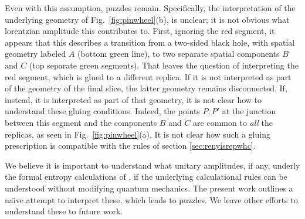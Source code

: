 \documentclass[12pt]{article}
\numberwithin{equation}{section}
\begin{document}
Even with this assumption, puzzles remain. Specifically, 
the interpretation of the underlying geometry of Fig.~\ref{fig:pinwheel}(b), is unclear;  it is not obvious what lorentzian amplitude this contributes to.  First, ignoring the red segment, it appears that this describes a transition from a two-sided black hole, with spatial geometry labeled $A$ (bottom green line), to two separate spatial components $B$ and $C$ (top separate green segments). That leaves the question of interpreting the red segment, which is glued to a different replica.  If it is not interpreted as part of the geometry of the final slice, the latter geometry remains disconnected.  If, instead, it is interpreted as part of that geometry, it is not clear how to understand these gluing conditions.  Indeed, the points $P, P'$ at the junction between this segment and the components $B$ and $C$ are common to {\it all} the replicas, as seen in Fig.~\ref{fig:pinwheel}(a).  It is
 not clear how such a gluing prescription is compatible with the rules of
 section \ref{sec:renyisrepwhc}. 

We believe it is important to understand what  unitary amplitudes, if any, underly the formal entropy calculations of \cite{Penington:2019kki, Almheiri:2019qdq}, if the underlying calculational rules can be understood without modifying quantum mechanics.  The present work outlines a na\"\i ve attempt to interpret these, which leads to puzzles.  We leave other efforts to understand these to future work.



{}
\end{document}
